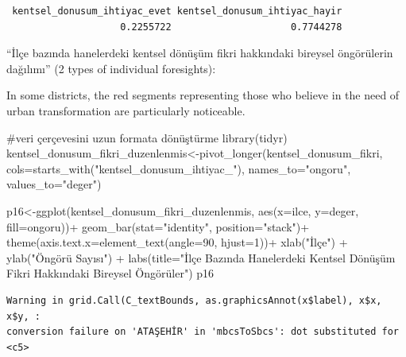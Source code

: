 \documentclass[
  11pt,
  a4paper,
  DIV=11,
  numbers=noendperiod]{scrartcl}
\newenvironment{Shaded}{\begin{snugshade}}{\end{snugshade}}
\newcommand{\AttributeTok}[1]{\textcolor[rgb]{0.40,0.45,0.13}{#1}}
\newcommand{\CommentTok}[1]{\textcolor[rgb]{0.37,0.37,0.37}{#1}}
\newcommand{\DecValTok}[1]{\textcolor[rgb]{0.68,0.00,0.00}{#1}}
\newcommand{\FunctionTok}[1]{\textcolor[rgb]{0.28,0.35,0.67}{#1}}
\newcommand{\NormalTok}[1]{\textcolor[rgb]{0.00,0.23,0.31}{#1}}
\newcommand{\OtherTok}[1]{\textcolor[rgb]{0.00,0.23,0.31}{#1}}
\newcommand{\SpecialCharTok}[1]{\textcolor[rgb]{0.37,0.37,0.37}{#1}}
\newcommand{\StringTok}[1]{\textcolor[rgb]{0.13,0.47,0.30}{#1}}
\begin{document}
\begin{verbatim}
 kentsel_donusum_ihtiyac_evet kentsel_donusum_ihtiyac_hayir 
                    0.2255722                     0.7744278 
\end{verbatim}

``İlçe bazında hanelerdeki kentsel dönüşüm fikri hakkındaki bireysel
öngörülerin dağılımı'' (2 types of individual foresights):

In some districts, the red segments representing those who believe in
the need of urban transformation are particularly noticeable.

\begin{Shaded}
\begin{Highlighting}[]
\CommentTok{\#veri çerçevesini uzun formata dönüştürme}
\FunctionTok{library}\NormalTok{(tidyr)}
\NormalTok{kentsel\_donusum\_fikri\_duzenlenmis}\OtherTok{\textless{}{-}}\FunctionTok{pivot\_longer}\NormalTok{(kentsel\_donusum\_fikri, }\AttributeTok{cols=}\FunctionTok{starts\_with}\NormalTok{(}\StringTok{"kentsel\_donusum\_ihtiyac\_"}\NormalTok{), }\AttributeTok{names\_to=}\StringTok{"ongoru"}\NormalTok{, }\AttributeTok{values\_to=}\StringTok{"deger"}\NormalTok{)}

\NormalTok{p16}\OtherTok{\textless{}{-}}\FunctionTok{ggplot}\NormalTok{(kentsel\_donusum\_fikri\_duzenlenmis, }\FunctionTok{aes}\NormalTok{(}\AttributeTok{x=}\NormalTok{ilce, }\AttributeTok{y=}\NormalTok{deger, }\AttributeTok{fill=}\NormalTok{ongoru))}\SpecialCharTok{+}
  \FunctionTok{geom\_bar}\NormalTok{(}\AttributeTok{stat=}\StringTok{"identity"}\NormalTok{, }\AttributeTok{position=}\StringTok{"stack"}\NormalTok{)}\SpecialCharTok{+}
  \FunctionTok{theme}\NormalTok{(}\AttributeTok{axis.text.x=}\FunctionTok{element\_text}\NormalTok{(}\AttributeTok{angle=}\DecValTok{90}\NormalTok{, }\AttributeTok{hjust=}\DecValTok{1}\NormalTok{))}\SpecialCharTok{+}
  \FunctionTok{xlab}\NormalTok{(}\StringTok{"İlçe"}\NormalTok{) }\SpecialCharTok{+}
  \FunctionTok{ylab}\NormalTok{(}\StringTok{"Öngörü Sayısı"}\NormalTok{) }\SpecialCharTok{+}
  \FunctionTok{labs}\NormalTok{(}\AttributeTok{title=}\StringTok{"İlçe Bazında Hanelerdeki Kentsel Dönüşüm Fikri Hakkındaki Bireysel Öngörüler"}\NormalTok{)}
\NormalTok{p16}
\end{Highlighting}
\end{Shaded}

\begin{verbatim}
Warning in grid.Call(C_textBounds, as.graphicsAnnot(x$label), x$x, x$y, :
conversion failure on 'ATAŞEHİR' in 'mbcsToSbcs': dot substituted for <c5>
\end{verbatim}
\end{document}
